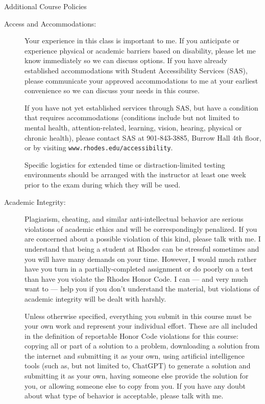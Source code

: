 \documentclass [letterpaper,11pt]{article}
\begin{document}
\begin{center}
\Large Additional Course Policies
\end{center}

\begin{description}

\item[Access and Accommodations:]
Your experience in this class is important to me.  If you anticipate or experience physical or academic barriers based on disability, please let me know immediately so we can discuss options.  If you have already established accommodations with Student Accessibility Services (SAS), please communicate your approved accommodations to me at your earliest convenience so we can discuss your needs in this course.

If you have not yet established services through SAS, but have a condition that requires accommodations (conditions include but not limited to mental health, attention-related, learning, vision, hearing, physical or chronic health), please contact SAS at 901-843-3885, Burrow Hall 4th floor, or by visiting  \texttt{www.rhodes.edu/accessibility}.

Specific logistics for extended time or distraction-limited testing environments should be arranged with the instructor 
at least one week prior to the exam during which they 
will be used.

  \item[Academic Integrity:]
   Plagiarism, cheating, and similar anti-intellectual behavior are serious violations of academic ethics and will be correspondingly penalized. If you are concerned about a possible violation of this kind, please talk with me.  I understand that being a student at Rhodes 
can be stressful sometimes and you will have many demands on your time.  However, I would
much rather have you turn in a partially-completed assignment or do poorly on a test than
have you violate the Rhodes Honor Code.  I can --- and very much want to --- help you if you don't understand the material, but violations of academic integrity will be dealt with harshly.
   
Unless otherwise specified, everything you submit in this course must be your own work and represent
your individual effort.  These are all included in the definition of reportable Honor Code violations for this course:
copying all or part of a solution to a problem, downloading a solution from the internet and submitting it as your own, using artificial intelligence tools (such as, but not 
limited to, ChatGPT) to generate a solution and submitting it as your own,
having someone else provide the solution for you, or allowing someone else to copy from you.    If you have any doubt about what type of behavior is acceptable, please talk with me.


\end{description}
\end{document}
